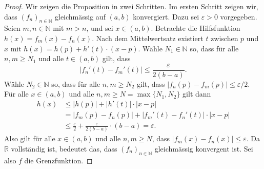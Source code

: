 \documentclass[../main.tex]{subfiles}
\begin{document}
\begin{proof}
  Wir zeigen die Proposition in zwei Schritten. Im ersten Schritt zeigen wir,
  dass ${(f_{n})}_{n \in \mathbb{N}}$ gleichmässig auf $(a, b)$ konvergiert.
  Dazu sei $\varepsilon > 0$ vorgegeben. Seien $m, n \in \mathbb{N}$ 
  mit $m > n$, und sei $x \in (a, b)$.
  Betrachte die Hilfsfunktion
  \(
    h(x) = f_m(x) - f_n(x)
  \).
  Nach dem Mittelwertsatz existiert $ t$ zwischen $p$ und $x$ mit
  $h(x) =  h(p) + h'(t) \cdot (x - p)$.
  Wähle $N_1 \in \mathbb{N}$ so, dass für alle $n , m \geq N_1$ und
  alle $t \in (a, b)$ gilt, dass
  \[
  |f_n'(t) - f_m'(t)| \leq \frac{\varepsilon }{2(b-a)}.
  \]
  Wähle $N_2 \in \mathbb{N}$ so, dass für alle $n , m \geq N_2$ gilt,
  dass
  \(
    |f_n(p) - f_m(p)| \leq \varepsilon/2
  \).
  Für alle $x \in (a, b)$ und alle $n, m \geq N = \max\{N_1, N_2\}$ gilt dann
   \begin{align*}
     h(x) 
     &\leq |h(p)| + |h'(t)| \cdot |x - p|  \\
     &= |f_m(p) - f_n(p)| + |f_m'(t) - f_n'(t)| \cdot |x - p| \\
     & \leq \frac{\varepsilon}{2} + \frac{\varepsilon}{2(b-a)}\cdot (b-a) = \varepsilon.
  \end{align*}
  Also gilt für alle $x \in (a, b)$ und alle $n, m \geq N$, dass
  $|f_m(x) - f_n(x)| \leq \varepsilon$. Da $\mathbb{R}$ vollständig ist,
  bedeutet das, dass ${(f_{n})}_{n \in \mathbb{N}}$ gleichmässig konvergent ist.
  Sei also $f$ die Grenzfunktion.
  

\end{proof}
\end{document}
